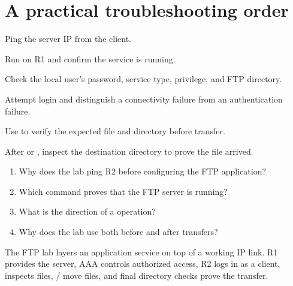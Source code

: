 \section{A practical troubleshooting order}
\begin{netsteps}
\item Ping the server IP from the client.
\item Run  on R1 and confirm the service is running.
\item Check the local user's password, service type, privilege, and FTP directory.
\item Attempt login and distinguish a connectivity failure from an authentication failure.
\item Use  to verify the expected file and directory before transfer.
\item After  or , inspect the destination directory to prove the file arrived.
\end{netsteps}

\begin{quickcheck}
\begin{enumerate}
\item Why does the lab ping R2 before configuring the FTP application?
\item Which command proves that the FTP server is running?
\item What is the direction of a  operation?
\item Why does the lab use  both before and after transfers?
\end{enumerate}
\end{quickcheck}

\begin{chapterrecap}
The FTP lab layers an application service on top of a working IP link. R1 provides the server, AAA controls authorized access, R2 logs in as a client,  inspects files, / move files, and final directory checks prove the transfer.
\end{chapterrecap}
